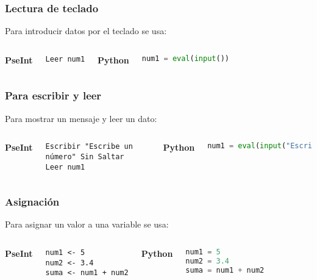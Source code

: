 \begin{frame}[fragile]
  \frametitle{Lectura de teclado}

  Para introducir datos por el teclado se usa:
  \vspace{\baselineskip}
  \begin{columns}
      \textbf{PseInt}
      \begin{lstlisting}[style=pseudocodigo]
Leer num1
      \end{lstlisting}
    \pausa
      \textbf{Python}
      \begin{lstlisting}[language=Python]
num1 = eval(input())
      \end{lstlisting}
  \end{columns}
\end{frame}

\begin{frame}[fragile]
  \frametitle{Para escribir y leer}

  Para mostrar un mensaje y leer un dato:
  \vspace{\baselineskip}
  \begin{columns}
      \textbf{PseInt}
      \begin{lstlisting}[style=pseudocodigo]
Escribir "Escribe un número" Sin Saltar
Leer num1
      \end{lstlisting}
    \pausa
      \textbf{Python}
      \begin{lstlisting}[language=Python]
num1 = eval(input("Escribe un número"))
      \end{lstlisting}
  \end{columns}
\end{frame}

\begin{frame}[fragile]
  \frametitle{Asignación}

  Para asignar un valor a una variable se usa:
  \vspace{\baselineskip}
  \begin{columns}
      \textbf{PseInt}
      \begin{lstlisting}[style=pseudocodigo]
num1 <- 5
num2 <- 3.4
suma <- num1 + num2
      \end{lstlisting}
    \pausa
      \textbf{Python}
      \begin{lstlisting}[language=Python]
num1 = 5
num2 = 3.4
suma = num1 + num2
      \end{lstlisting}
  \end{columns}
\end{frame}

